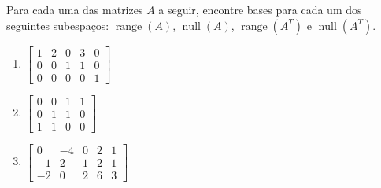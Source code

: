 \begin{question}
  Para cada uma das matrizes \( A \) a seguir, encontre bases para cada um dos seguintes subespaços: \( \operatorname{range}(A) \), \( \operatorname{null}(A) \), \( \operatorname{range}(A^T) \) e \( \operatorname{null}(A^T) \).
  \begin{multicols}{3}
    \begin{enumerate}[label=\alph*)]
      \item $\begin{bmatrix}
                1 & 2 & 0 & 3 & 0 \\
                0 & 0 & 1 & 1 & 0 \\
                0 & 0 & 0 & 0 & 1
              \end{bmatrix}$
      \item $\begin{bmatrix}
                0 & 0 & 1 & 1 \\
                0 & 1 & 1 & 0 \\
                1 & 1 & 0 & 0
              \end{bmatrix}$

      \item $\begin{bmatrix}
                0  & -4 & 0 & 2 & 1 \\
                -1 & 2  & 1 & 2 & 1 \\
                -2 & 0  & 2 & 6 & 3
              \end{bmatrix}$
    \end{enumerate}
  \end{multicols}
  \vspace{8pt}
\end{question}

